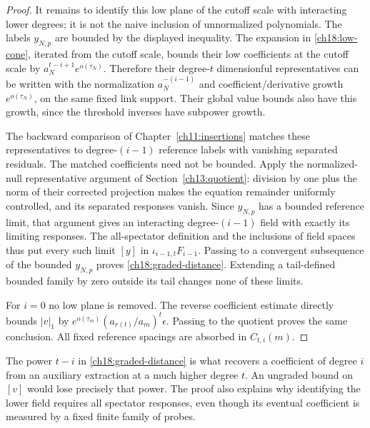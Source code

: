 \begin{proof}
It remains to identify this low plane of the cutoff scale with interacting lower
degrees; it is not the naive inclusion of unnormalized polynomials.
The labels $y_{N,p}$ are bounded by the displayed inequality.
The expansion in \eqref{ch18:low-cone}, iterated from the cutoff
scale, bounds their low coefficients at the cutoff scale by
$a_N^{t-i+1}e^{o(\tau_N)}$. Therefore their degree-$t$ dimensionful
representatives can be written with the normalization $a_N^{-(i-1)}$
and coefficient/derivative growth $e^{o(\tau_N)}$, on the same fixed
link support. Their global value bounds also have this growth, since the
threshold inverses have subpower growth.

The backward comparison of Chapter~\ref{ch11:insertions} matches
these representatives to degree-$(i-1)$ reference labels with vanishing
separated residuals. The matched coefficients need not be bounded.
Apply the normalized-null representative argument of
Section~\ref{ch13:quotient}: division by one plus the norm of their
corrected projection makes the equation remainder uniformly controlled,
and its separated responses vanish. Since $y_{N,p}$ has a bounded
reference limit, that argument gives an interacting degree-$(i-1)$ field
with exactly its limiting responses. The all-spectator definition and
the inclusions of field spaces thus put every such limit $[y]$ in
$\iota_{i-1,t}F_{i-1}$. Passing to a convergent subsequence of the bounded
$y_{N,p}$ proves \eqref{ch18:graded-distance}. Extending a tail-defined
bounded family by zero outside its tail changes none of these limits.

For $i=0$ no low plane is removed. The reverse coefficient estimate
directly bounds $|v|_1$ by
$e^{o(\tau_m)}(a_{r(t)}/a_m)^t\epsilon$. Passing to the quotient
proves the same conclusion. All fixed reference spacings are absorbed
in $C_{t,i}(m)$.
\end{proof}

The power $t-i$ in \eqref{ch18:graded-distance} is what recovers a
coefficient of degree $i$ from an auxiliary extraction at a much higher
degree $t$. An ungraded bound on $[v]$ would lose precisely that power.
The proof also explains why identifying the lower field requires all
spectator responses, even though its eventual coefficient is measured
by a fixed finite family of probes.
